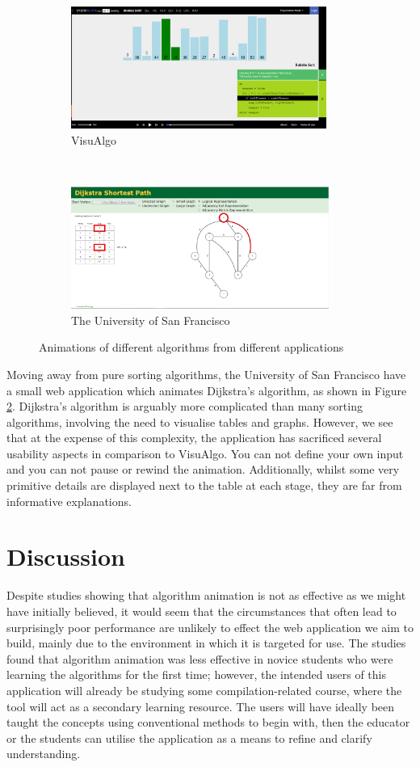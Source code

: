 \documentclass{l4proj}
\begin{document}
\begin{figure}
	\centering
	\begin{subfigure}[b]{0.45\textwidth}
		\includegraphics[height=4cm,width=\linewidth]{images/visualgo.png}
		\caption{VisuAlgo}
		\label{fig:visualgo}
	\end{subfigure}
	~
	\begin{subfigure}[b]{0.45\textwidth}
		\includegraphics[height=4cm,width=\linewidth]{images/dijkstra.png}
		\caption{The University of San Francisco}
		\label{fig:dijkstra}
	\end{subfigure}
	\caption{Animations of different algorithms from different applications}\label{fig:visualgo-dijkstra}	
\end{figure}


Moving away from pure sorting algorithms, the University of San Francisco have a small web application which animates Dijkstra's algorithm\cite{dijkstra}, as shown in Figure \ref{fig:dijkstra}. Dijkstra's algorithm is arguably more complicated than many sorting algorithms, involving the need to visualise tables and graphs. However, we see that at the expense of this complexity, the application has sacrificed several usability aspects in comparison to VisuAlgo. You can not define your own input and you can not pause or rewind the animation. Additionally, whilst some very primitive details are displayed next to the table at each stage, they are far from informative explanations. 

\section{Discussion}
Despite studies showing that algorithm animation is not as effective as we might have initially believed, it would seem that the circumstances that often lead to surprisingly poor performance are unlikely to effect the web application we aim to build, mainly due to the environment in which it is targeted for use. The studies found that algorithm animation was less effective in novice students who were learning the algorithms for the first time; however, the intended users of this application will already be studying some compilation-related course, where the tool will act as a secondary learning resource. The users will have ideally been taught the concepts using conventional methods to begin with, then the educator or the students can utilise the application as a means to refine and clarify understanding.
\end{document}

